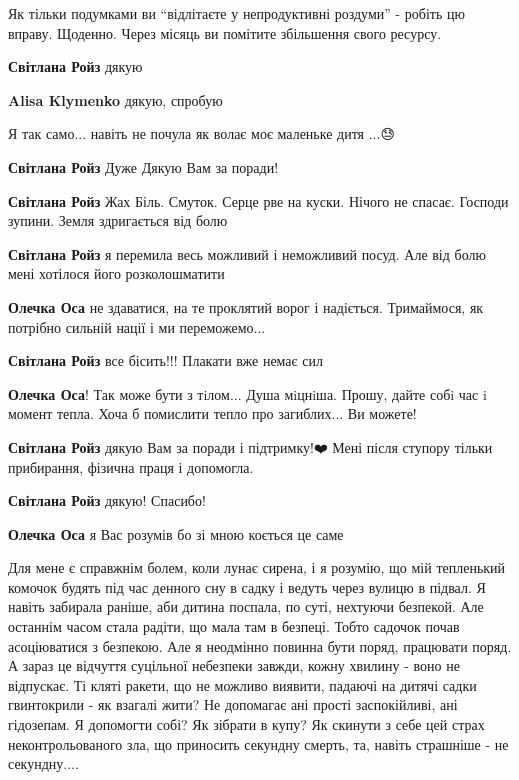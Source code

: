 \begin{itemize}
\begin{itemize}
Як тільки подумками ви \enquote{відлітаєте у непродуктивні роздуми} - робіть цю
вправу. Щоденно. Через місяць ви помітите збільшення свого ресурсу.

\textbf{Світлана Ройз} дякую 🙏

\textbf{Alisa Klymenko} дякую, спробую 🙏


Я так само... навіть не почула як волає моє маленьке дитя ...😓

\textbf{Світлана Ройз} Дуже Дякую Вам за поради!

\textbf{Світлана Ройз} Жах Біль. Смуток. Серце рве на куски. Нічого не спасає.
Господи зупини. Земля здригається від болю🙏🏻🙏🏻🙏🏻

\textbf{Світлана Ройз} я перемила весь можливий і неможливий посуд. Але від болю мені хотілося його розколошматити

\textbf{Олечка Оса} не здаватися, на те проклятий ворог і надіється. Тримаймося, як потрібно сильній нації і ми переможемо...

\textbf{Світлана Ройз} все бісить!!! Плакати вже немає сил

\textbf{Олечка Оса}!
Так може бути з тiлом...
Душа мiцнiша. Прошу, дайте собi час i момент тепла.
Хоча б помислити тепло про загиблих... Ви можете!

\textbf{Світлана Ройз} дякую Вам за поради і підтримку!❤️ Мені після ступору тільки прибирання, фізична праця і допомогла.

\textbf{Світлана Ройз} дякую! Спасибо!

\textbf{Олечка Оса} я Вас розумів бо зі мною коється це саме


\end{itemize} %


Для мене є справжнім болем, коли лунає сирена, і я розумію, що мій тепленький
комочок будять під час денного сну в садку і ведуть через вулицю в підвал. Я
навіть забирала раніше, аби дитина поспала, по суті, нехтуючи безпекой. Але
останнім часом стала радіти, що мала там в безпеці. Тобто садочок почав
асоціюватися з безпекою. Але я неодмінно повинна бути поряд, працювати поряд. А
зараз це відчуття суцільної небезпеки завжди, кожну хвилину - воно не
відпускає. Ті кляті ракети, що не можливо виявити, падаючі на дитячі садки
гвинтокрили - як взагалі жити? Не допомагає ані прості заспокійливі, ані
гідозепам. Я допомогти собі? Як зібрати в купу? Як скинути з себе цей страх
неконтрольованого зла, що приносить секундну смерть, та, навіть страшніше - не
секундну....


\end{itemize}
